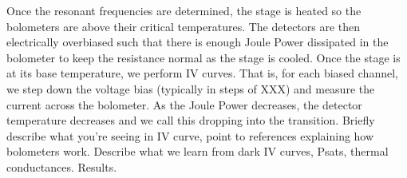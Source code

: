 %
%
%

Once the resonant frequencies are determined, the stage is heated so the bolometers are above their critical temperatures. 
The detectors are then electrically overbiased such that there is enough Joule Power dissipated in the bolometer to keep the resistance normal as the stage is cooled. 
Once the stage is at its base temperature, we perform IV curves. 
That is, for each biased channel, we step down the voltage bias (typically in steps of XXX) and measure the current across the bolometer. 
As the Joule Power decreases, the detector temperature decreases and we call this dropping into the transition. 
Briefly describe what you're seeing in IV curve, point to references explaining how bolometers work. 
Describe what we learn from dark IV curves, Psats, thermal conductances. 
Results. 

